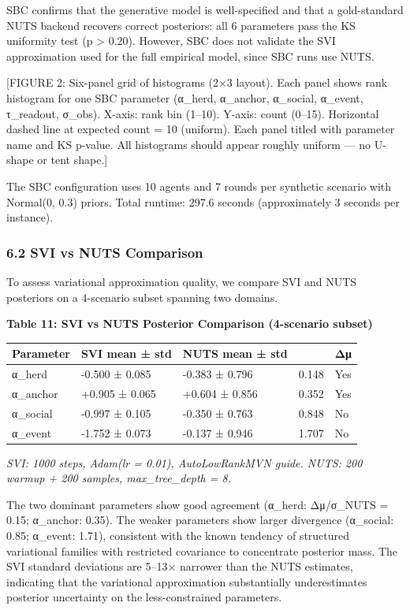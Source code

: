 \documentclass[
]{article}
\begin{document}
SBC confirms that the generative model is well-specified and that a
gold-standard NUTS backend recovers correct posteriors: all 6 parameters
pass the KS uniformity test (p \textgreater{} 0.20). However, SBC does
not validate the SVI approximation used for the full empirical model,
since SBC runs use NUTS.

{[}FIGURE 2: Six-panel grid of histograms (2×3 layout). Each panel shows
rank histogram for one SBC parameter (α\_herd, α\_anchor, α\_social,
α\_event, τ\_readout, σ\_obs). X-axis: rank bin (1--10). Y-axis: count
(0--15). Horizontal dashed line at expected count = 10 (uniform). Each
panel titled with parameter name and KS p-value. All histograms should
appear roughly uniform --- no U-shape or tent shape.{]}

The SBC configuration uses 10 agents and 7 rounds per synthetic scenario
with Normal(0, 0.3) priors. Total runtime: 297.6 seconds (approximately
3 seconds per instance).

\subsubsection{6.2 SVI vs NUTS Comparison}\label{svi-vs-nuts-comparison}

To assess variational approximation quality, we compare SVI and NUTS
posteriors on a 4-scenario subset spanning two domains.

\textbf{Table 11: SVI vs NUTS Posterior Comparison (4-scenario subset)}

\begin{longtable}[]{@{}lllll@{}}
\toprule\noalign{}
Parameter & SVI mean ± std & NUTS mean ± std & & Δμ \\
\midrule\noalign{}
\endhead
\bottomrule\noalign{}
\endlastfoot
α\_herd & -0.500 ± 0.085 & -0.383 ± 0.796 & 0.148 & Yes \\
α\_anchor & +0.905 ± 0.065 & +0.604 ± 0.856 & 0.352 & Yes \\
α\_social & -0.997 ± 0.105 & -0.350 ± 0.763 & 0.848 & No \\
α\_event & -1.752 ± 0.073 & -0.137 ± 0.946 & 1.707 & No \\
\end{longtable}

\emph{SVI: 1000 steps, Adam(lr = 0.01), AutoLowRankMVN guide. NUTS: 200
warmup + 200 samples, max\_tree\_depth = 8.}

The two dominant parameters show good agreement (α\_herd:
\textbar Δμ\textbar/σ\_NUTS = 0.15; α\_anchor: 0.35). The weaker
parameters show larger divergence (α\_social: 0.85; α\_event: 1.71),
consistent with the known tendency of structured variational families
with restricted covariance to concentrate posterior mass. The SVI
standard deviations are 5--13× narrower than the NUTS estimates,
indicating that the variational approximation substantially
underestimates posterior uncertainty on the less-constrained parameters.
\end{document}
